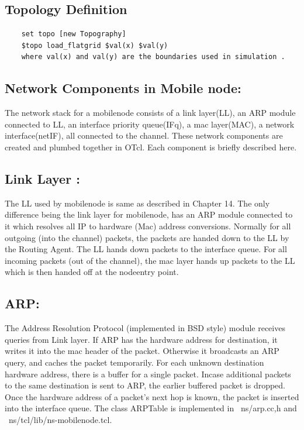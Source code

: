 \documentclass[11pt]{article}
\begin{document}
\subsection{Topology Definition}

\begin{verbatim}
    set topo [new Topography]
    $topo load_flatgrid $val(x) $val(y)
    where val(x) and val(y) are the boundaries used in simulation .
\end{verbatim}

\subsection{Network Components in Mobile node: }


The network stack for a mobilenode consists of a link
layer(LL), an ARP module connected to LL, an interface priority queue(IFq), a mac layer(MAC), a
network interface(netIF), all connected to the channel. These network components are created and
plumbed together in OTcl. Each component is briefly described here.

\subsection{Link Layer : }

The LL used by mobilenode is same as described in Chapter 14. The only difference being
the link layer for mobilenode, has an ARP module connected to it which resolves all IP to hardware
(Mac) address conversions. Normally for all outgoing (into the channel) packets, the packets are handed
down to the LL by the Routing Agent. The LL hands down packets to the interface queue. For all
incoming packets (out of the channel), the mac layer hands up packets to the LL which is then
handed off at the nodeentry point.

\subsection{ARP: }


The Address Resolution Protocol (implemented in BSD style) module receives queries from Link
layer. If ARP has the hardware address for destination, it writes it into the mac header of the packet.
Otherwise it broadcasts an ARP query, and caches the packet temporarily. For each unknown destination
hardware address, there is a buffer for a single packet. Incase additional packets to the same destination is
sent to ARP, the earlier buffered packet is dropped. Once the hardware address of a packet’s next hop is
known, the packet is inserted into the interface queue. The class ARPTable is implemented in
~ns/arp.{cc,h} and ~ns/tcl/lib/ns-mobilenode.tcl.
\end{document}
